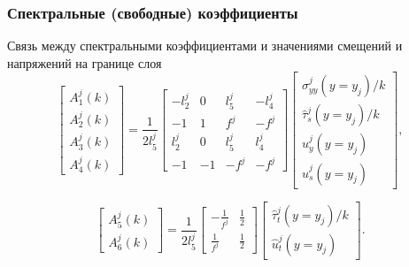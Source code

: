 \begin{frame}
    \frametitle{Спектральные (свободные) коэффициенты}
    Связь между спектральными коэффициентами и значениями смещений и напряжений на границе слоя
    \begin{equation}
        \left[
        \begin{array}{c}
        A^{j}_{1}(k) \\
        A^{j}_{2}(k)\\
        A^{j}_{3}(k) \\
        A^{j}_{4}(k)
        \end{array}
        \right]
        = \frac{1}{2l^j_5}
        \left[
        \begin{array}{cccc}
            -l^j_2 & 0 & l^j_5 & -l^j_4 \\
            -1 & 1 & f^j & -f^j \\
            l^j_2 & 0 & l^j_5 & l^j_4 \\
            -1 & -1 & -f^j & -f^j
        \end{array}
        \right]
        \left[
        \begin{array}{c}
        \hat{\sigma}^{j}_{yy}(y=y_j)/k \\
        \hat{\tau}^{j}_{s}(y=y_j)/k\\
        \hat{u}^{j}_{y}(y=y_j) \\
        \hat{u}^{j}_{s}(y=y_j) 
        \end{array}
        \right],
    \end{equation}

    \begin{equation}
        \left[
        \begin{array}{c}
            A^{j}_{5}(k) \\
            A^{j}_{6}(k)
        \end{array}
        \right]
        = \frac{1}{2l^j_5}
        \left[
        \begin{array}{cc}
            -\frac{1}{f^j} & \frac{1}{2} \\
            \frac{1}{f^j} & \frac{1}{2}
        \end{array}
        \right]
        \left[
        \begin{array}{c}
        \hat{\tau}^{j}_{t}(y=y_j)/k\\
        \hat{u}^{j}_{t}(y=y_j) 
        \end{array}
        \right].
    \end{equation}
\end{frame}

